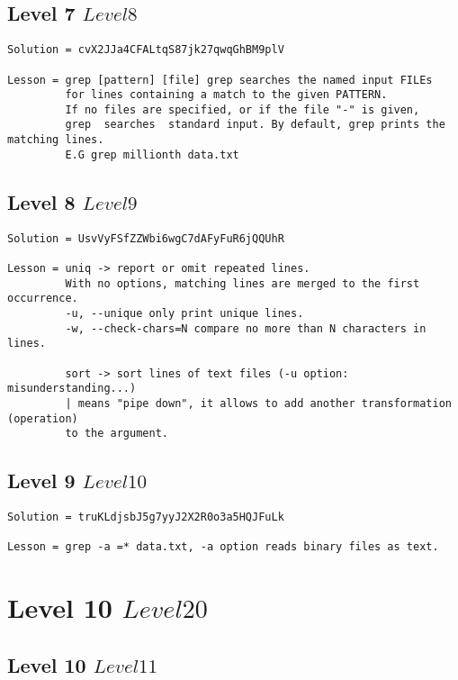 \documentclass[a4paper]{report}
\begin{document}
\section{Level 7 \rightarrow $ Level 8 $}

\begin{verbatim}
Solution = cvX2JJa4CFALtqS87jk27qwqGhBM9plV

Lesson = grep [pattern] [file] grep searches the named input FILEs 
		 for lines containing a match to the given PATTERN. 
		 If no files are specified, or if the file "-" is given, 
		 grep  searches  standard input. By default, grep prints the matching lines. 
		 E.G grep millionth data.txt
\end{verbatim}


\section{Level 8 \rightarrow $ Level 9 $}

\begin{verbatim}
Solution = UsvVyFSfZZWbi6wgC7dAFyFuR6jQQUhR

Lesson = uniq -> report or omit repeated lines. 
		 With no options, matching lines are merged to the first occurrence. 
		 -u, --unique only print unique lines. 
		 -w, --check-chars=N compare no more than N characters in lines. 
		 
		 sort -> sort lines of text files (-u option: misunderstanding...) 
		 | means "pipe down", it allows to add another transformation (operation) 
		 to the argument.
\end{verbatim}


\section{Level 9 \rightarrow $ Level 10 $}

\begin{verbatim}
Solution = truKLdjsbJ5g7yyJ2X2R0o3a5HQJFuLk

Lesson = grep -a =* data.txt, -a option reads binary files as text.
\end{verbatim}



\chapter{Level 10 \rightarrow $ Level 20 $}

\section{Level 10 \rightarrow $ Level 11 $}
\end{document}
